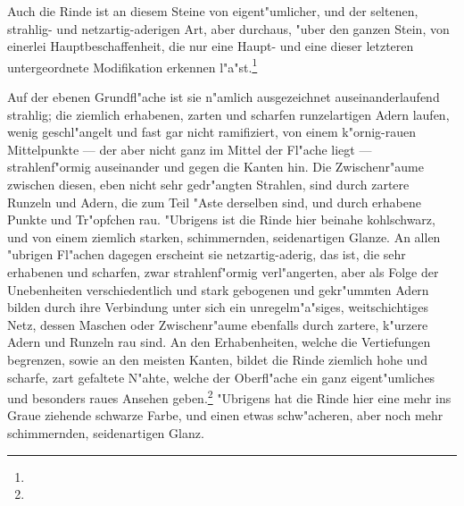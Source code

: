 \documentclass[a4paper, 11pt, oneside, german]{article}
\begin{document}
Auch die Rinde ist an diesem Steine von eigent"umlicher, und der seltenen, strahlig- und netzartig-aderigen Art, aber durchaus, "uber den ganzen Stein, von einerlei Hauptbeschaffenheit, die nur eine Haupt- und eine dieser letzteren untergeordnete Modifikation erkennen l"a"st.\footnote{}

Auf der ebenen Grundfl"ache ist sie n"amlich ausgezeichnet auseinanderlaufend strahlig; die ziemlich erhabenen, zarten und scharfen runzelartigen Adern laufen, wenig geschl"angelt und fast gar nicht ramifiziert, von einem k"ornig-rauen Mittelpunkte --- der aber nicht ganz im Mittel der Fl"ache liegt --- strahlenf"ormig auseinander und gegen die Kanten hin. Die Zwischenr"aume zwischen diesen, eben nicht sehr gedr"angten Strahlen, sind durch zartere Runzeln und Adern, die zum Teil "Aste derselben sind, und durch erhabene Punkte und Tr"opfchen rau. "Ubrigens ist die Rinde hier beinahe kohlschwarz, und von einem ziemlich starken, schimmernden, seidenartigen Glanze. An allen "ubrigen Fl"achen dagegen erscheint sie netzartig-aderig, das ist, die sehr erhabenen und scharfen, zwar strahlenf"ormig verl"angerten, aber als Folge der Unebenheiten verschiedentlich und stark gebogenen und gekr"ummten Adern bilden durch ihre Verbindung unter sich ein unregelm"a"siges, weitschichtiges Netz, dessen Maschen oder Zwischenr"aume ebenfalls durch zartere, k"urzere Adern und Runzeln rau sind. An den Erhabenheiten, welche die Vertiefungen begrenzen, sowie an den meisten Kanten, bildet die Rinde ziemlich hohe und scharfe, zart gefaltete N"ahte, welche der Oberfl"ache ein ganz eigent"umliches und besonders raues Ansehen geben.\footnote{} "Ubrigens hat die Rinde hier eine mehr ins Graue ziehende schwarze Farbe, und einen etwas schw"acheren, aber noch mehr schimmernden, seidenartigen Glanz.
\end{document}
